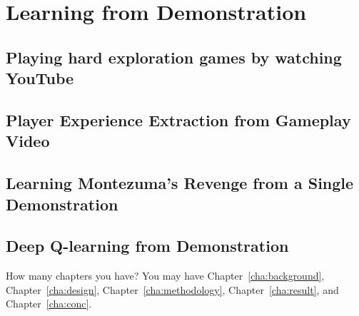 \chapter{Learning from Demonstration}
\label{cha:Ref1}

\section{Playing hard exploration games by watching YouTube}


\section{Player Experience Extraction from Gameplay Video}

\section{Learning Montezuma's Revenge from a Single Demonstration}

\section{Deep Q-learning from Demonstration}

How many chapters you have? You may have Chapter~\ref{cha:background},
Chapter~\ref{cha:design}, Chapter~\ref{cha:methodology},
Chapter~\ref{cha:result}, and Chapter~\ref{cha:conc}.
